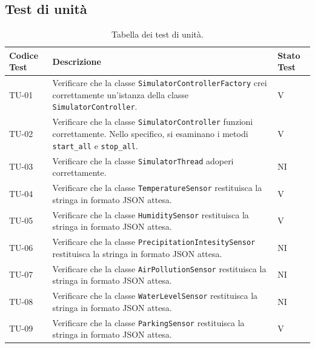 \documentclass[8pt]{article}
\begin{document}
\subsection{Test di unità}
\renewcommand{\arraystretch}{2.5}
\begin{longtable}{|>{\centering}p{2cm}|>{\RaggedRight}m{12cm}|>{\centering\arraybackslash}p{2cm}|}
    \hline
    \rowcolor{white}
    \textbf{Codice Test} & \textbf{Descrizione} & \textbf{Stato Test} \\
    \hline
    \endfirsthead 
    \rowcolor{white}
    \caption{Tabella dei test di unità.} 
    \label{table:Tabella dei test di unità}
    \endlastfoot 
    
    TU-01 & Verificare che la classe \verb|SimulatorControllerFactory| crei correttamente un'istanza
    della classe \verb|SimulatorController|.  & V \\
    \hline

    TU-02 & Verificare che la classe \verb|SimulatorController| funzioni correttamente. Nello
    specifico, si esaminano i metodi \verb|start_all| e \verb|stop_all|.  & V \\
    \hline

    TU-03 & Verificare che la classe \verb|SimulatorThread| adoperi correttamente. & NI \\
    \hline

    TU-04 & Verificare che la classe \verb|TemperatureSensor| restituisca la stringa in formato JSON attesa. & V \\
    \hline

    TU-05 & Verificare che la classe \verb|HumiditySensor| restituisca la stringa in formato JSON attesa. & V \\
    \hline

    TU-06 & Verificare che la classe \verb|PrecipitationIntesitySensor| restituisca la stringa in formato JSON attesa. & NI \\
    \hline

    TU-07 & Verificare che la classe \verb|AirPollutionSensor| restituisca la stringa in formato JSON attesa. & NI \\
    \hline

    TU-08 & Verificare che la classe \verb|WaterLevelSensor| restituisca la stringa in formato JSON attesa. & NI \\
    \hline

    TU-09 & Verificare che la classe \verb|ParkingSensor| restituisca la stringa in formato JSON attesa. & V \\
    \hline


\end{longtable}
\end{document}

